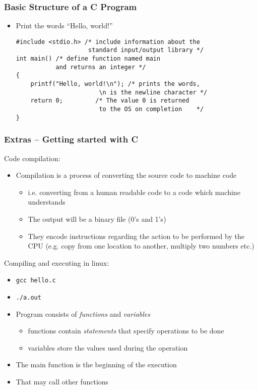 \documentclass[11pt]{beamer}
\begin{document}
\begin{frame}[fragile]\frametitle{Basic Structure of a C Program}
\label{sec-1-4}

\begin{itemize}
\item Print the words ``Hello, world!''


\begin{verbatim}
#include <stdio.h> /* include information about the 
                    standard input/output library */
int main() /* define function named main 
           and returns an integer */
{
    printf("Hello, world!\n"); /* prints the words, 
                       \n is the newline character */
    return 0;         /* The value 0 is returned 
                       to the OS on completion    */
}
\end{verbatim}
\end{itemize}
\end{frame}
\begin{frame}[fragile]\frametitle{Extras -- Getting started with C}
\label{sec-1-5}

Code compilation:
\begin{itemize}
\item Compilation is a process of converting the source code to machine code
\begin{itemize}
\item i.e. converting from a human readable code to a code which machine understands
\item The output will be a binary file (0's and 1's)
\item They encode instructions regarding the action to be performed by the CPU (e.g. copy from one location to another, multiply two numbers etc.)
\end{itemize}
\end{itemize}
Compiling and executing in linux:
\begin{itemize}
\item \verb~gcc hello.c~
\item \verb~./a.out~
\item Program consists of \emph{functions} and \emph{variables}
\begin{itemize}
\item functions contain \emph{statements} that specify operations to be done
\item variables store the values used during the operation
\end{itemize}
\item The main function is the beginning of the execution
\item That may call other functions
\end{itemize}
\end{frame}
\end{document}
